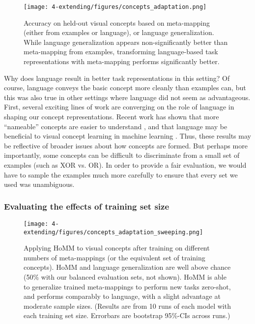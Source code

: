 \begin{figure}
\centering
\texttt{[image: 4-extending/figures/concepts\_adaptation.png]}
\caption[Accuracy on held-out visual concepts.]{Accuracy on held-out visual concepts based on meta-mapping (either from examples or language), or language generalization. While language generalization appears non-significantly better than meta-mapping from examples, transforming language-based task representations with meta-mapping performs significantly better.} \label{fig:extending_concepts_adaptation} 
\end{figure}

Why does language result in better task representations in this setting? Of course, language conveys the basic concept more cleanly than examples can, but this was also true in other settings where language did not seem as advantageous. First, several exciting lines of work are converging on the role of language in shaping our concept representations. Recent work has shown that more ``nameable'' concepts are easier to understand \citep{Lupyan2020}, and that language may be beneficial to visual concept learning in machine learning \citep{Mu2019}. Thus, these results may be reflective of broader issues about how concepts are formed. But perhaps more importantly, some concepts can be difficult to discriminate from a small set of examples (such as XOR vs. OR). In order to provide a fair evaluation, we would have to sample the examples much more carefully to ensure that every set we used was unambiguous. \par

\subsubsection{Evaluating the effects of training set size}
\begin{figure}[htb]
\centering
\texttt{[image: 4-extending/figures/concepts\_adaptation\_sweeping.png]}
\caption[Applying HoMM to visual concepts after training on different numbers of meta-mappings.]{Applying HoMM to visual concepts after training on different numbers of meta-mappings (or the equivalent set of training concepts). HoMM and language generalization are well above chance (50\% with our balanced evaluation sets, not shown). HoMM is able to generalize trained meta-mappings to perform new tasks zero-shot, and performs comparably to language, with a slight advantage at moderate sample sizes. (Results are from 10 runs of each model with each training set size. Errorbars are bootstrap 95\%-CIs across runs.)} \label{fig:extending_concepts_sweeping_results}
\end{figure}

